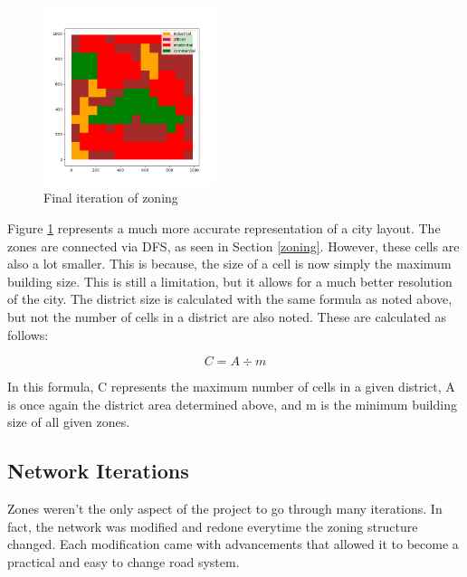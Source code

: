 \documentclass[11pt]{article}
\begin{document}
\begin{multicols}{2}
    \begin{figure}[H]
        \centering
        \vspace{-1em}
        \includegraphics[width=0.45\textwidth]{images/finalzoning.png}
        \caption{Final iteration of zoning}
        \label{fig:final-zoning}
    \end{figure}

    \quad Figure \ref{fig:final-zoning} represents a much more accurate representation of a city layout. The zones are connected via DFS, as seen in Section \ref{zoning}. However, these cells are also a lot smaller. This is because, the size of a cell is now simply the maximum building size. This is still a limitation, but it allows for a much better resolution of the city. The district size is calculated with the same formula as noted above, but not the number of cells in a district are also noted. These are calculated as follows:

    \[C = A \div m\]

    In this formula, C represents the maximum number of cells in a given district, A is once again the district area determined above, and m is the minimum building size of all given zones.

    \subsection{Network Iterations}

    \quad Zones weren't the only aspect of the project to go through many iterations. In fact, the network was modified and redone everytime the zoning structure changed. Each modification came with advancements that allowed it to become a practical and easy to change road system.


\end{multicols}
\end{document}
